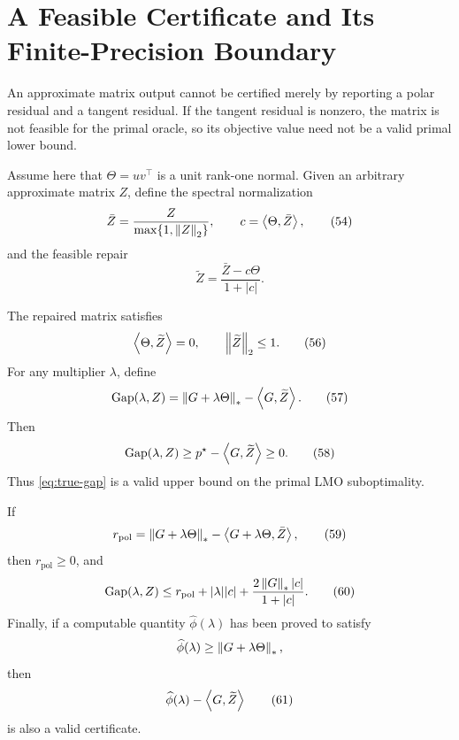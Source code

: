 \section{A Feasible Certificate and Its Finite-Precision Boundary}
\label{sec:certificates}

An approximate matrix output cannot be certified merely by reporting a polar
residual and a tangent residual.  If the tangent residual is nonzero, the
matrix is not feasible for the primal oracle, so its objective value need not
be a valid primal lower bound.

Assume here that \(\Theta=uv^\top\) is a unit rank-one normal.  Given an
arbitrary approximate matrix \(Z\), define the spectral normalization
\begin{equation}
\bar Z
=
\frac{Z}{\max\{1,\left\lVert Z\right\rVert_{2}\}},
\qquad
c=\left\langle \Theta,\bar Z\right\rangle,
\tag{54}
\label{eq:Zbar-c}
\end{equation}
and the feasible repair
\begin{equation}
\widetilde Z
=
\frac{\bar Z-c\Theta}{1+|c|}.
\tag{55}
\label{eq:Ztilde}
\end{equation}

\begin{theorem}
\label{thm:T6}
The repaired matrix satisfies
\begin{equation}
\left\langle \Theta,\widetilde Z\right\rangle=0,
\qquad
\left\lVert \widetilde Z\right\rVert_{2}\le1.
\tag{56}
\label{eq:T6-feas}
\end{equation}
For any multiplier \(\lambda\), define
\begin{equation}
\operatorname{Gap}(\lambda,Z)
=
\left\lVert G+\lambda\Theta\right\rVert_{*}
-\left\langle G,\widetilde Z\right\rangle.
\tag{57}
\label{eq:true-gap}
\end{equation}
Then
\begin{equation}
\operatorname{Gap}(\lambda,Z)
\ge
p^\star-\left\langle G,\widetilde Z\right\rangle
\ge0.
\tag{58}
\label{eq:gap-cover}
\end{equation}
Thus \eqref{eq:true-gap} is a valid upper bound on the primal LMO
suboptimality.

If
\begin{equation}
r_{\mathrm{pol}}
=
\left\lVert G+\lambda\Theta\right\rVert_{*}
-\left\langle G+\lambda\Theta,\bar Z\right\rangle,
\tag{59}
\label{eq:rpol}
\end{equation}
then \(r_{\mathrm{pol}}\ge0\), and
\begin{equation}
\operatorname{Gap}(\lambda,Z)
\le
r_{\mathrm{pol}}
+|\lambda||c|
+\frac{2\left\lVert G\right\rVert_{*}|c|}{1+|c|}.
\tag{60}
\label{eq:gap-decomposition}
\end{equation}
Finally, if a computable quantity \(\widehat\phi(\lambda)\) has been proved to
satisfy
\[
\widehat\phi(\lambda)\ge\left\lVert G+\lambda\Theta\right\rVert_{*},
\]
then
\begin{equation}
\widehat\phi(\lambda)-\left\langle G,\widetilde Z\right\rangle
\tag{61}
\label{eq:upper-certificate}
\end{equation}
is also a valid certificate.
\end{theorem}

